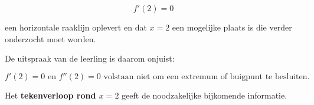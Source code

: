 \documentclass{ximera}
\begin{document}
\begin{oefening}{\oefG}
\begin{oplossing}
    \[
    f'(2)=0
    \]
    
    een horizontale raaklijn oplevert en dat $x=2$ een mogelijke plaats
    is die verder onderzocht moet worden.
    
    De uitspraak van de leerling is daarom onjuist:
    
    \[
    \boxed{
    f'(2)=0\text{ en }f''(2)=0
    \text{ volstaan niet om een extremum of buigpunt te besluiten.}
    }
    \]
    
    Het \textbf{tekenverloop rond $x=2$} geeft de noodzakelijke
    bijkomende informatie.
    
    \end{oplossing}
  
  \end{oefening}
\end{document}
